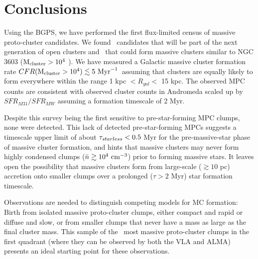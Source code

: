 \section{Conclusions}
\label{sec:ympcconclusions}

Using the BGPS, we have performed the first flux-limited census of massive
proto-cluster candidates.  We found \ncandidates\ candidates that will be part
of the next generation of open clusters and \nMPC\ that could form massive
clusters similar to NGC 3603 (${\rm M}_{\rm cluster} > 10^4$ \msun).   We have
measured a Galactic massive cluster formation rate $CFR({\rm M}_{\rm
cluster}>10^4) \lesssim 5\  \mathrm{Myr}^{-1}$\ assuming that clusters are equally
likely to form everywhere within the range 1 kpc $ < R_{gal} < $ 15   kpc. 
The observed MPC counts are
consistent with observed cluster counts in Andromeda scaled up by $SFR_{M31} /
SFR_{MW}$ assuming a formation timescale of 2 Myr.  

Despite this survey being the first sensitive to pre-star-forming MPC clumps, none
were detected.  This lack of detected pre-star-forming MPCs suggests a
timescale upper limit of about $\tau_{starless}<0.5$ Myr for the pre-massive-star phase of
massive cluster formation, and hints that massive clusters may never form
highly condensed clumps ($\bar{n}\gtrsim10^4~\textrm{cm}^{-3}$) prior to forming massive
stars.
It leaves open the possibility that massive clusters form from large-scale
($\gtrsim 10$ pc) accretion onto smaller clumps over a prolonged ($\tau > 2$
Myr) star formation timescale.


Observations are needed to distinguish competing models for MC formation:
Birth from isolated massive proto-cluster clumps, either compact and rapid
or diffuse and slow, or from smaller clumps that
never have a mass as large as the final cluster
mass.  
This sample of the \ncandidates\ most massive proto-cluster clumps in the first
quadrant (where they can be observed by both the VLA and ALMA) presents an ideal
starting point for these observations.



%






